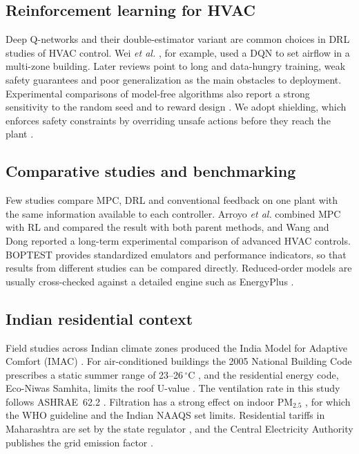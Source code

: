 \subsection{Reinforcement learning for HVAC}
Deep Q-networks \cite{mnih2015} and their double-estimator variant
\cite{vanhasselt2016} are common choices in DRL studies of HVAC control. Wei
\emph{et al.} \cite{wei2017}, for example, used a DQN to set airflow in a multi-zone
building.
Later reviews \cite{wanghong2020,yu2021,sierla2022} point to long and data-hungry
training, weak safety guarantees and poor generalization as the main obstacles to
deployment. Experimental comparisons of model-free algorithms also report a strong
sensitivity to the random seed and to reward design \cite{biemann2021}. We adopt
shielding, which enforces safety constraints by overriding unsafe actions before they
reach the plant \cite{alshiekh2018}.

\subsection{Comparative studies and benchmarking}
Few studies compare MPC, DRL and conventional feedback on one plant with the same
information available to each controller. Arroyo \emph{et al.} \cite{arroyo2022} combined MPC with RL
and compared the result with both parent methods, and Wang and Dong \cite{wangdong2024}
reported a long-term experimental comparison of advanced HVAC controls. BOPTEST
\cite{blum2021} provides standardized emulators and performance indicators, so that
results from different studies can be compared directly. Reduced-order models are
usually cross-checked against a detailed engine such as EnergyPlus \cite{crawley2001}.

\subsection{Indian residential context}
Field studies across Indian climate zones produced the India Model for Adaptive Comfort
(IMAC) \cite{manu2016}. For air-conditioned buildings the 2005 National Building Code
prescribes a static summer range of 23--26\,$^\circ$C \cite{nbc2005}, and the
residential energy code, Eco-Niwas Samhita, limits the roof U-value \cite{ens2018}.
The ventilation rate in this study follows ASHRAE~62.2 \cite{ashrae622}. Filtration has
a strong effect on indoor PM$_{2.5}$ \cite{belias2022}, for which the WHO guideline
\cite{who2021} and the Indian NAAQS \cite{cpcb2009} set limits. Residential tariffs in
Maharashtra are set by the state regulator \cite{merc}, and the Central Electricity
Authority publishes the grid emission factor \cite{cea}.

